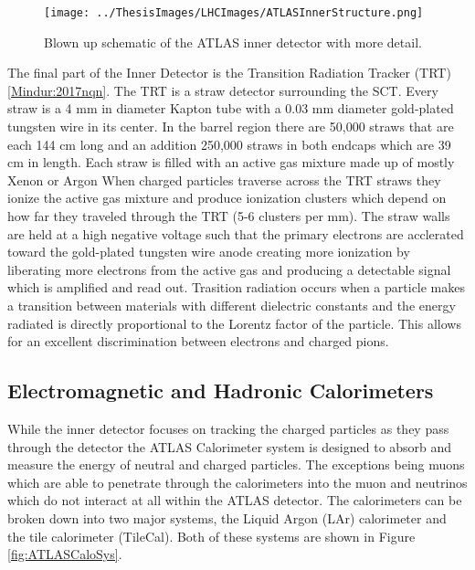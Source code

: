 \begin{figure}[h!]
	\centering
	\texttt{[image: ../ThesisImages/LHCImages/ATLASInnerStructure.png]}
	\caption[Blown up schematic of the ATLAS inner detector with more detail.]{Blown up schematic of the ATLAS inner detector with more detail.\cite{Potamianos:2016ptf}
	}
	\label{fig:ATLASInnerDet}
\end{figure}

The final part of the Inner Detector is the Transition Radiation Tracker (TRT) \ref{Mindur:2017nqn}.  The TRT is a straw detector surrounding the SCT.  Every straw is a 4 mm in diameter Kapton tube with a 0.03 mm diameter gold-plated tungsten wire in its center.  In the barrel region there are 50,000 straws that are each 144 cm long and an addition 250,000 straws in both endcaps which are 39 cm in length.  Each straw is filled with an active gas mixture made up of mostly Xenon or Argon
When charged particles traverse across the TRT straws they ionize the active gas mixture and produce ionization clusters which depend on how far they traveled through the TRT (5-6 clusters per mm).  The straw walls are held at a high negative voltage such that the primary electrons are acclerated toward the gold-plated tungsten wire anode creating more ionization by liberating more electrons from the active gas and producing a detectable signal which is amplified and read out.  Trasition radiation occurs when a particle makes a transition between materials with different dielectric constants and the energy radiated is directly proportional to the Lorentz factor of the particle.  This allows for an excellent discrimination between electrons and charged pions.



\subsection{Electromagnetic and Hadronic Calorimeters}
\label{sec:EMHCal}
While the inner detector focuses on tracking the charged particles as they pass through the detector the ATLAS Calorimeter system is designed to absorb and measure the energy of neutral and charged particles.  The exceptions being muons which are able to penetrate through the calorimeters into the muon and neutrinos which do not interact at all within the ATLAS detector.  The calorimeters can be broken down into two major systems, the Liquid Argon (LAr) calorimeter\cite{CERN-LHCC-96-041} and the tile calorimeter (TileCal)\cite{CERN-LHCC-96-042}.  Both of these systems are shown in Figure \ref{fig:ATLASCaloSys}.

